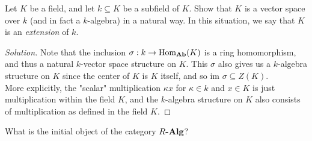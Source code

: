 \documentclass[12pt]{article}
\newenvironment{problem}[2][Problem]{\begin{trivlist}
\item[\hskip \labelsep {\bfseries #1}\hskip \labelsep {\bfseries #2.}]}{\end{trivlist}}
\newcommand{\catname}[1]{\normalfont\textbf{#1}}
\newcommand{\Hom}{\text{Hom}}
\newcommand{\Homc}[2]{\Hom_{\catname{#1}}(#2)}
\newcommand{\im}{\text{im }}
\newenvironment{solution}
  {\renewcommand\qedsymbol{$\blacksquare$}\begin{proof}[Solution]}
{\end{proof}}
\theoremstyle{remark}
\begin{document}
\begin{problem}{5.7}
  Let $K$ be a field, and let $k\subseteq K$ be a subfield of $K$.
  Show that $K$ is a vector space over $k$ (and in fact a $k$-algebra) in a natural way.
  In this situation, we say that $K$ is an \textit{extension} of $k$.
\end{problem}
\begin{solution}
  Note that the inclusion $\sigma:k\to\Homc{Ab}{K}$ is a ring homomorphism, and thus a natural
  $k$-vector space structure on $K$.
  This $\sigma$ also gives us a $k$-algebra structure on $K$ since the center of $K$ is $K$
  itself, and so $\im\sigma\subseteq Z(K)$.\\
  \indent More explicitly, the "scalar" multiplication $\kappa x$ for $\kappa\in k$ and $x\in K$
  is just multiplication within the field $K$, and the $k$-algebra structure on $K$
  also consists of multiplication as defined in the field $K$.
\end{solution}

\begin{problem}{5.8}
  What is the initial object of the category $R\catname{-Alg}$?
\end{problem}<++>
\end{document}
